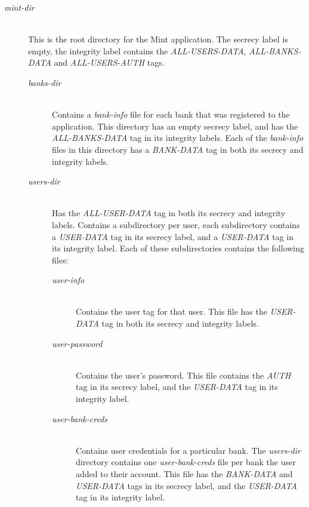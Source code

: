 \begin{description}
  \item[\emph{mint-dir}] \ \\
    This is the root directory for the Mint 
    application.
    The secrecy label is empty, the integrity 
    label contains the \emph{ALL-USERS-DATA}, 
    \emph{ALL-BANKS-DATA} and 
    \emph{ALL-USERS-AUTH} tags.
  \begin{description}
    \item[\emph{banks-dir}] \ \\
      Contains a \emph{bank-info} file for each 
      bank that was registered to the 
      application. This 
      directory has an empty secrecy label, and 
      has the \emph{ALL-BANKS-DATA} tag in its 
      integrity labels.
      Each of the \emph{bank-info} files in 
      this directory has a \emph{BANK-DATA} 
      tag in both its secrecy and integrity 
      labels.
    \item[\emph{users-dir}] \ \\
      Has the \emph{ALL-USER-DATA} tag in both 
      its secrecy and integrity labels. Contains 
      a subdirectory per user, each subdirectory 
      contains a \emph{USER-DATA} tag in its 
      secrecy label, and a \emph{USER-DATA} tag 
      in its integrity label.
      Each of these subdirectories contains the 
      following files:
      \begin{description}
        \item[\emph{user-info}] \ \\
          Contains the user tag for that user.
          This file has the \emph{USER-DATA} tag 
          in both its secrecy and integrity labels.
        \item[\emph{user-password}] \ \\
          Contains the user's password.
          This file contains the \emph{AUTH} tag in 
          its secrecy label, and the \emph{USER-DATA} 
          tag in its integrity label.
        \item[\emph{user-bank-creds}] \ \\
          Contains user credentials for a particular 
          bank.
          The \emph{users-dir} directory contains 
          one \emph{user-bank-creds} file per bank 
          the user added to their account.
          This file has the \emph{BANK-DATA} and 
          \emph{USER-DATA} tags in its secrecy label, 
          and the \emph{USER-DATA} tag in its 
          integrity label.
      \end{description}
  \end{description}
\end{description}

